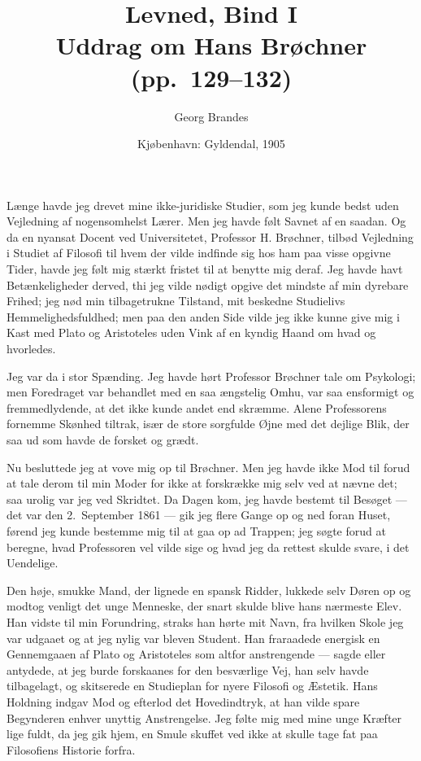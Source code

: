 \documentclass[12pt,a4paper]{article}
\title{\textbf{Levned}, Bind I\\[6pt]
  \large Uddrag om Hans Brøchner (pp.\ 129--132)}
\author{Georg Brandes}
\date{Kjøbenhavn: Gyldendal, 1905}
\newcommand{\pnum}[1]{\noindent\makebox[0pt][r]{\small\textit{[#1]}\quad}}
\newcommand{\apage}[1]{\marginnote{\footnotesize\textit{[#1]}}}
\begin{document}
\maketitle
\thispagestyle{fancy} \apage{129}

\bigskip

\noindent Længe havde jeg drevet mine ikke-juridiske Studier, som jeg
kunde bedst uden Vejledning af nogensomhelst Lærer. Men jeg havde følt
Savnet af en saadan. Og da en nyansat Docent ved Universitetet,
Professor H. Brøchner, tilbød Vejledning i Studiet af Filosofi til
hvem der vilde indfinde sig hos ham paa visse opgivne Tider, havde jeg
følt mig stærkt fristet til at benytte mig deraf. Jeg havde havt
Betænkeligheder derved, thi jeg vilde nødigt opgive det mindste af min
dyrebare Frihed; jeg nød min tilbagetrukne Tilstand, mit beskedne
Studielivs Hemmelighedsfuldhed; men paa den anden Side vilde jeg ikke
kunne give mig i Kast med Plato og Aristoteles uden Vink af en kyndig
Haand om hvad og hvorledes.

Jeg var da i stor Spænding. Jeg havde hørt Professor Brøchner tale om
Psykologi; men Foredraget var behandlet med en saa ængstelig Omhu, var
saa ensformigt og fremmedlydende, at det ikke kunde andet end skræmme.
Alene Professorens fornemme Skønhed tiltrak, især de store sorgfulde
Øjne med det dejlige Blik, der saa ud som havde de forsket og grædt.

\pnum{130}Nu \apage{130} besluttede jeg at vove mig op til Brøchner. Men jeg
havde ikke Mod til forud at tale derom til min Moder for ikke at
forskrække mig selv ved at nævne det; saa urolig var jeg ved Skridtet.
Da Dagen kom, jeg havde bestemt til Besøget --- det var den 2.\ September
1861 --- gik jeg flere Gange op og ned foran Huset, førend jeg kunde
bestemme mig til at gaa op ad Trappen; jeg søgte forud at beregne,
hvad Professoren vel vilde sige og hvad jeg da rettest skulde svare, i
det Uendelige.

Den høje, smukke Mand, der lignede en spansk Ridder, lukkede selv
Døren op og modtog venligt det unge Menneske, der snart skulde blive
hans nærmeste Elev. Han vidste til min Forundring, straks han hørte
mit Navn, fra hvilken Skole jeg var udgaaet og at jeg nylig var bleven
Student. Han fraraadede energisk en Gennemgaaen af Plato og Aristoteles
som altfor anstrengende --- sagde eller antydede, at jeg burde
forskaanes for den besværlige Vej, han selv havde tilbagelagt, og
skitserede en Studieplan for nyere Filosofi og Æstetik. Hans Holdning
indgav Mod og efterlod det Hovedindtryk, at han vilde spare Begynderen
enhver unyttig Anstrengelse. Jeg følte mig med mine unge Kræfter lige
fuldt, da jeg gik hjem, en Smule skuffet ved ikke at skulle tage fat
paa Filosofiens Historie forfra.
\end{document}

